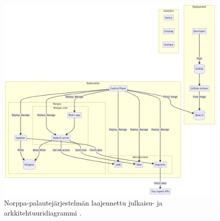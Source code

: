 \begin{figure}[ht]
\begin{center}
\includegraphics[width=1\textwidth]{figures/norppa_diagram.png}
\caption{Norppa-palautejärjestelmän laajennettu julkaisu- ja arkkitehtuuridiagrammi \cite{Norppa23}\label{fig:norppa}.}
\end{center}
\end{figure}
